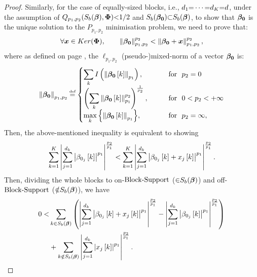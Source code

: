 \begin{proof}
Similarly, for the case of equally-sized blocks, i.e., $d_1 {=} \cdots {=} d_K {=} d$, under the assumption of $Q_{p_1,p_2}(S_b(\boldsymbol{\beta}),\boldsymbol{\Phi}) {<} 1/2$ and $S_b(\boldsymbol{\beta_0}) {\subset} S_b(\boldsymbol{\beta})$, to show that $\boldsymbol{\beta_0}$ is the unique solution to the $P_{p_1,p_2}$ minimisation problem, we need to prove that:
\begin{equation*}
\forall \boldsymbol{x} \in Ker(\boldsymbol{\Phi}), \qquad \left\lVert\boldsymbol{\beta_0}\right\rVert_{p_1,p_2}^{p_2} <
\left\lVert\boldsymbol{\beta_0}+\boldsymbol{x}\right\rVert_{p_1,p_2}^{p_2},
\end{equation*}
where as defined on page \pageref{eq:MixedNormDef}, the $\ell_{p_1,p_2}$ (pseudo-)mixed-norm of a vector $\boldsymbol{\beta_0}$ is:
\begin{equation*}
\mynorm{\mybetaz}_{p_1,p_2} \myeq 
\begin{cases}
    \displaystyle\sum_{k}^{} I \myparanthese{\mynorm{\mybetaz \mybracket{k}}_{p_1}}, & \qquad \text{for \ }p_2= 0\\
    \myparanthese{\displaystyle\sum_{k}^{} \mynorm{\mybetaz \mybracket{k}}_{p_1}^ {p_2}} ^ {\frac{1}{p_2}},  & \qquad  \text{for \ } 0 < p_2 < +\infty\\
    \displaystyle\max_{k}{\mybrace{\mynorm{\mybetaz \mybracket{k}}_{p_1}}}, & \qquad \text{for \ } p_2= \infty,
  \end{cases}
\end{equation*}
Then, the above-mentioned inequality is equivalent to showing 
\begin{equation*}
\displaystyle\sum_{k=1}^{K} \left\lvert\displaystyle\sum_{j=1}^{d_k} \left\lvert\beta_{0_j}\left[ k \right]\right\rvert ^{p_1}\right\rvert ^{\frac{p_2}{p_1}} 
< \displaystyle\sum_{k=1}^{K} \left\lvert\displaystyle\sum_{j=1}^{d_k} \left\lvert\beta_{0_j}\left[ k \right] + x_{j}\left[ k \right]\right\rvert ^{p_1}\right\rvert ^{\frac{p_2}{p_1}}.
\end{equation*}
Then, dividing the whole blocks to on-$\mathrm{Block\text{{-}}Support}$ (${\in} S_b(\boldsymbol{\beta})$) and off-$\mathrm{Block\text{{-}}Support}$ (${\notin} S_b(\boldsymbol{\beta})$), we have
\begin{gather*}
\begin{aligned}
 0 < &\displaystyle\sum_{k \in S_b\myparanthese{\mybeta}} \myparanthese{\myabs{\displaystyle\sum_{j=1}^{d_k} \myabs{\beta_{0_j}\mybracket{k} + x_{j}\mybracket{k}} ^{p_1}} ^{\frac{p_2}{p_1}} - 
\myabs{\displaystyle\sum_{j=1}^{d_k} \myabs{\beta_{0_j}\mybracket{k}} ^{p_1}} ^{\frac{p_2}{p_1}}} \\ 
&+ \displaystyle\sum_{k \notin S_b\myparanthese{\mybeta}} \myabs{\displaystyle\sum_{j=1}^{d_k} \myabs{x_{j}\mybracket{k}} ^{p_1}} ^{\frac{p_2}{p_1}}.
\end{aligned}

\end{gather*}
\end{proof}
